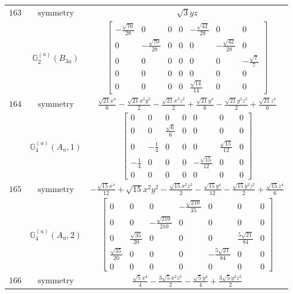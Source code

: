\documentclass[fleqn,8pt,landscape]{jsarticle}
\begin{document}
\begin{longtable}{ccc}
$ 163 $ & $ \text{symmetry} $ & $ \sqrt{3} y z $ \\
$  $ & $ \mathbb{G}_{2}^{(a)}(B_{3u}) $ & $ \begin{bmatrix} - \frac{\sqrt{70}}{28} & 0 & 0 & 0 & - \frac{\sqrt{42}}{28} & 0 & 0 \\ 0 & - \frac{\sqrt{70}}{28} & 0 & 0 & 0 & - \frac{\sqrt{42}}{28} & 0 \\ 0 & 0 & 0 & 0 & 0 & 0 & - \frac{\sqrt{7}}{7} \\ 0 & 0 & 0 & 0 & 0 & 0 & 0 \\ 0 & 0 & 0 & 0 & \frac{\sqrt{14}}{14} & 0 & 0 \end{bmatrix} $ \\ \hline
$ 164 $ & $ \text{symmetry} $ & $ \frac{\sqrt{21} x^{4}}{6} - \frac{\sqrt{21} x^{2} y^{2}}{2} - \frac{\sqrt{21} x^{2} z^{2}}{2} + \frac{\sqrt{21} y^{4}}{6} - \frac{\sqrt{21} y^{2} z^{2}}{2} + \frac{\sqrt{21} z^{4}}{6} $ \\
$  $ & $ \mathbb{G}_{4}^{(a)}(A_{u},1) $ & $ \begin{bmatrix} 0 & 0 & 0 & 0 & 0 & 0 & 0 \\ 0 & 0 & \frac{\sqrt{6}}{6} & 0 & 0 & 0 & 0 \\ 0 & - \frac{1}{4} & 0 & 0 & 0 & \frac{\sqrt{15}}{12} & 0 \\ - \frac{1}{4} & 0 & 0 & 0 & - \frac{\sqrt{15}}{12} & 0 & 0 \\ 0 & 0 & 0 & 0 & 0 & 0 & 0 \end{bmatrix} $ \\ \hline
$ 165 $ & $ \text{symmetry} $ & $ - \frac{\sqrt{15} x^{4}}{12} + \sqrt{15} x^{2} y^{2} - \frac{\sqrt{15} x^{2} z^{2}}{2} - \frac{\sqrt{15} y^{4}}{12} - \frac{\sqrt{15} y^{2} z^{2}}{2} + \frac{\sqrt{15} z^{4}}{6} $ \\
$  $ & $ \mathbb{G}_{4}^{(a)}(A_{u},2) $ & $ \begin{bmatrix} 0 & 0 & 0 & - \frac{\sqrt{210}}{35} & 0 & 0 & 0 \\ 0 & 0 & - \frac{\sqrt{210}}{210} & 0 & 0 & 0 & 0 \\ 0 & \frac{\sqrt{35}}{20} & 0 & 0 & 0 & \frac{5 \sqrt{21}}{84} & 0 \\ \frac{\sqrt{35}}{20} & 0 & 0 & 0 & - \frac{5 \sqrt{21}}{84} & 0 & 0 \\ 0 & 0 & 0 & 0 & 0 & 0 & 0 \end{bmatrix} $ \\ \hline
$ 166 $ & $ \text{symmetry} $ & $ \frac{\sqrt{5} x^{4}}{4} - \frac{3 \sqrt{5} x^{2} z^{2}}{2} - \frac{\sqrt{5} y^{4}}{4} + \frac{3 \sqrt{5} y^{2} z^{2}}{2} $ \\

\end{longtable}
\end{document}
